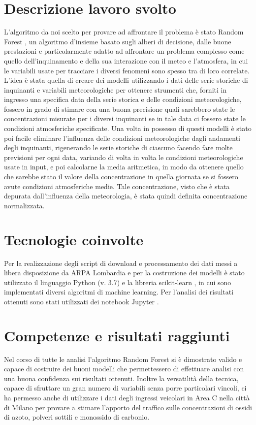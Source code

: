 \section{Descrizione lavoro svolto}
L'algoritmo da noi scelto per provare ad affrontare il problema è stato Random Forest \cite{breiman2001random}, un algoritmo d'insieme basato sugli alberi di decisione, dalle buone prestazioni e particolarmente adatto ad affrontare un problema complesso come quello dell'inquinamento e della sua interazione con il meteo e l'atmosfera, in cui le variabili usate per tracciare i diversi fenomeni sono spesso tra di loro correlate. L'idea è stata quella di creare dei modelli utilizzando i dati delle serie storiche di inquinanti e variabili meteorologiche per ottenere strumenti che, forniti in ingresso una specifica data della serie storica e delle condizioni meteorologiche, fossero in grado di stimare con una buona precisione quali sarebbero state le concentrazioni misurate per i diversi inquinanti se in tale data ci fossero state le condizioni atmosferiche specificate. Una volta in possesso di questi modelli è stato poi facile eliminare l'influenza delle condizioni meteorologiche dagli andamenti degli inquinanti, rigenerando le serie storiche di ciascuno facendo fare molte previsioni per ogni data, variando di volta in volta le condizioni meteorologiche usate in input, e poi calcolarne la media aritmetica, in modo da ottenere quello che sarebbe stato il valore della concentrazione in quella giornata se si fossero avute condizioni atmosferiche medie. Tale concentrazione, visto che è stata depurata dall'influenza della meteorologia, è stata quindi definita concentrazione normalizzata.

\section{Tecnologie coinvolte}
Per la realizzazione degli script di download e processamento dei dati messi a libera disposizione da ARPA Lombardia e per la costruzione dei modelli è stato utilizzato il linguaggio Python (v. 3.7) e la libreria scikit-learn \cite{scikit-learn}, in cui sono implementati diversi algoritmi di machine learning. Per l'analisi dei risultati ottenuti sono stati utilizzati dei notebook Jupyter \cite{Kluyver2016jupyter}.

\section{Competenze e risultati raggiunti}
Nel corso di tutte le analisi l'algoritmo Random Forest si è dimostrato valido e capace di costruire dei buoni modelli che permettessero di effettuare analisi con una buona confidenza sui risultati ottenuti. Inoltre la versatilità della tecnica, capace di sfruttare un gran numero di variabili senza porre particolari vincoli, ci ha permesso anche di utilizzare i dati degli ingressi veicolari in Area C nella città di Milano per provare a stimare l'apporto del traffico sulle concentrazioni di ossidi di azoto, polveri sottili e monossido di carbonio.

